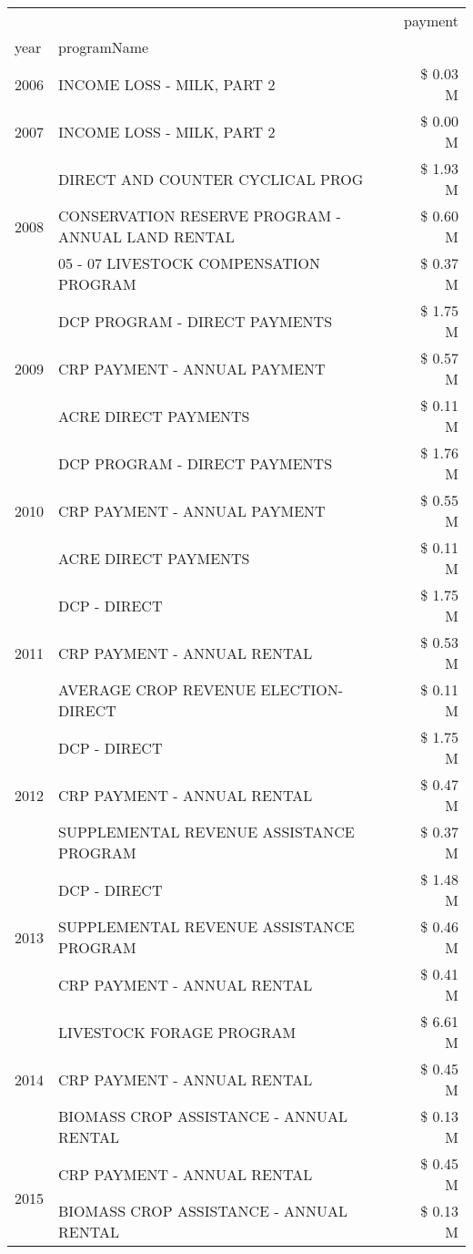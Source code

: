 \begin{tabular}{llr}
\toprule
 &  & payment \\
year & programName &  \\
\midrule
2006 & INCOME LOSS - MILK, PART 2 & \$ 0.03 M \\
\cline{1-3}
2007 & INCOME LOSS - MILK, PART 2 & \$ 0.00 M \\
\cline{1-3}
\multirow[t]{3}{*}{2008} & DIRECT AND COUNTER CYCLICAL PROG & \$ 1.93 M \\
 & CONSERVATION RESERVE PROGRAM - ANNUAL LAND RENTAL & \$ 0.60 M \\
 & 05 - 07 LIVESTOCK COMPENSATION PROGRAM & \$ 0.37 M \\
\cline{1-3}
\multirow[t]{3}{*}{2009} & DCP PROGRAM - DIRECT PAYMENTS & \$ 1.75 M \\
 & CRP PAYMENT - ANNUAL PAYMENT & \$ 0.57 M \\
 & ACRE DIRECT PAYMENTS & \$ 0.11 M \\
\cline{1-3}
\multirow[t]{3}{*}{2010} & DCP PROGRAM - DIRECT PAYMENTS & \$ 1.76 M \\
 & CRP PAYMENT - ANNUAL PAYMENT & \$ 0.55 M \\
 & ACRE DIRECT PAYMENTS & \$ 0.11 M \\
\cline{1-3}
\multirow[t]{3}{*}{2011} & DCP - DIRECT & \$ 1.75 M \\
 & CRP PAYMENT - ANNUAL RENTAL & \$ 0.53 M \\
 & AVERAGE CROP REVENUE ELECTION-DIRECT & \$ 0.11 M \\
\cline{1-3}
\multirow[t]{3}{*}{2012} & DCP - DIRECT & \$ 1.75 M \\
 & CRP PAYMENT - ANNUAL RENTAL & \$ 0.47 M \\
 & SUPPLEMENTAL REVENUE ASSISTANCE PROGRAM & \$ 0.37 M \\
\cline{1-3}
\multirow[t]{3}{*}{2013} & DCP - DIRECT & \$ 1.48 M \\
 & SUPPLEMENTAL REVENUE ASSISTANCE PROGRAM & \$ 0.46 M \\
 & CRP PAYMENT - ANNUAL RENTAL & \$ 0.41 M \\
\cline{1-3}
\multirow[t]{3}{*}{2014} & LIVESTOCK FORAGE PROGRAM & \$ 6.61 M \\
 & CRP PAYMENT - ANNUAL RENTAL & \$ 0.45 M \\
 & BIOMASS CROP ASSISTANCE - ANNUAL RENTAL & \$ 0.13 M \\
\cline{1-3}
\multirow[t]{3}{*}{2015} & CRP PAYMENT - ANNUAL RENTAL & \$ 0.45 M \\
 & BIOMASS CROP ASSISTANCE - ANNUAL RENTAL & \$ 0.13 M \\

\end{tabular}
